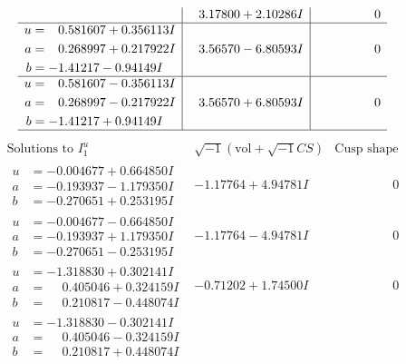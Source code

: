 \documentclass[1p]{elsarticle_modified}
\theoremstyle{definition}
\newcommand{\I}{\sqrt{-1}}
\begin{document}
$$\begin{array}{c|c|c}
 & \phantom{-}3.17800 + 2.10286 I & \phantom{-0.000000 } 0 \\ \hline\begin{aligned}
u &= \phantom{-}0.581607 + 0.356113 I \\
a &= \phantom{-}0.268997 + 0.217922 I \\
b &= -1.41217 - 0.94149 I\end{aligned}
 & \phantom{-}3.56570 - 6.80593 I & \phantom{-0.000000 } 0 \\ \hline\begin{aligned}
u &= \phantom{-}0.581607 - 0.356113 I \\
a &= \phantom{-}0.268997 - 0.217922 I \\
b &= -1.41217 + 0.94149 I\end{aligned}
 & \phantom{-}3.56570 + 6.80593 I & \phantom{-0.000000 } 0\\
 \hline 
 \end{array}$$\newpage$$\begin{array}{c|c|c}  
\text{Solutions to }I^u_{1}& \I (\text{vol} + \sqrt{-1}CS) & \text{Cusp shape}\\
 \hline 
\begin{aligned}
u &= -0.004677 + 0.664850 I \\
a &= -0.193937 - 1.179350 I \\
b &= -0.270651 + 0.253195 I\end{aligned}
 & -1.17764 + 4.94781 I & \phantom{-0.000000 } 0 \\ \hline\begin{aligned}
u &= -0.004677 - 0.664850 I \\
a &= -0.193937 + 1.179350 I \\
b &= -0.270651 - 0.253195 I\end{aligned}
 & -1.17764 - 4.94781 I & \phantom{-0.000000 } 0 \\ \hline\begin{aligned}
u &= -1.318830 + 0.302141 I \\
a &= \phantom{-}0.405046 + 0.324159 I \\
b &= \phantom{-}0.210817 - 0.448074 I\end{aligned}
 & -0.71202 + 1.74500 I & \phantom{-0.000000 } 0 \\ \hline\begin{aligned}
u &= -1.318830 - 0.302141 I \\
a &= \phantom{-}0.405046 - 0.324159 I \\
b &= \phantom{-}0.210817 + 0.448074 I\end{aligned}

\end{array}$$
\end{document}

